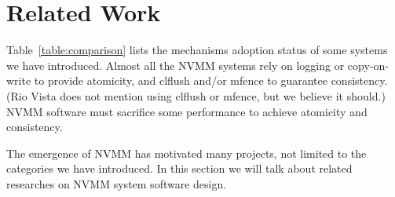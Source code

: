 \section{Related Work} 
\label{sec:related}

\begin{table}
	\vspace*{1mm}
	\caption{}
	\label{table:comparison}
\end{table}

Table~\ref{table:comparison} lists the mechanisms adoption status of some
systems we have introduced. Almost all the NVMM systems rely on logging or
copy-on-write to provide atomicity, and clflush and/or mfence to guarantee
consistency. (Rio Vista does not mention using clflush or mfence, but we believe
it should.) NVMM software must sacrifice some performance to achieve
atomicity and consistency.

The emergence of NVMM has motivated many projects, not limited to the categories
we have introduced. In this section we will talk about related researches
on NVMM system software design.

